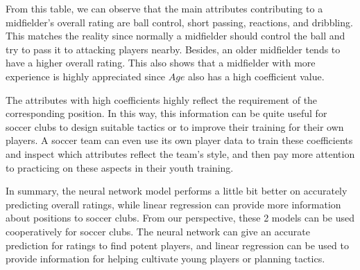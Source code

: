 \documentclass{article}
\begin{document}
From this table, we can observe that the main attributes contributing to a midfielder's overall rating are ball control, short passing, reactions, and dribbling. This matches the reality since normally a midfielder should control the ball and try to pass it to attacking players nearby. Besides, an older midfielder tends to have a higher overall rating. This also shows that a midfielder with more experience is highly appreciated since $Age$ also has a high coefficient value.

The attributes with high coefficients highly reflect the requirement of the corresponding position. In this way, this information can be quite useful for soccer clubs to design suitable tactics or to improve their training for their own players. A soccer team can even use its own player data to train these coefficients and inspect which attributes reflect the team's style, and then pay more attention to practicing on these aspects in their youth training.

In summary, the neural network model performs a little bit better on accurately predicting overall ratings, while linear regression can provide more information about positions to soccer clubs. From our perspective, these 2 models can be used cooperatively for soccer clubs. The neural network can give an accurate prediction for ratings to find potent players, and linear regression can be used to provide information for helping cultivate young players or planning tactics.

\nocite{*}


\end{document}

